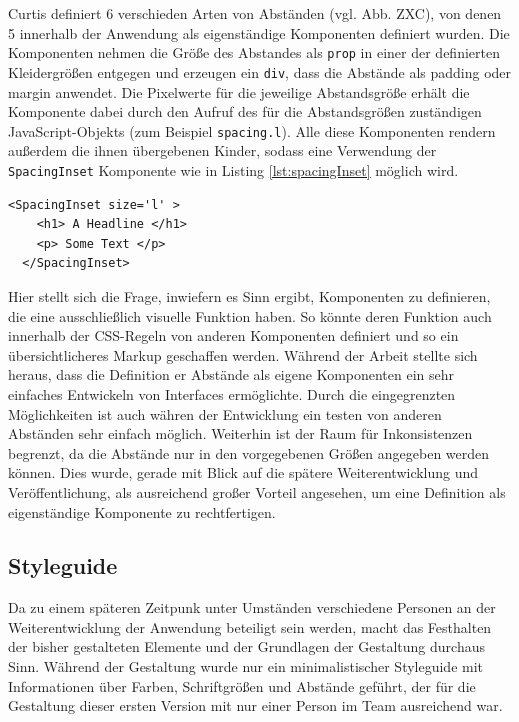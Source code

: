 Curtis definiert 6 verschieden Arten von Abständen (vgl. Abb. ZXC), von denen 5 innerhalb der Anwendung als eigenständige Komponenten definiert wurden.
Die Komponenten nehmen die Größe des Abstandes als \verb|prop| in einer der definierten Kleidergrößen entgegen und erzeugen ein \verb|div|, dass die Abstände als padding oder margin anwendet.
Die Pixelwerte für die jeweilige Abstandsgröße erhält die Komponente dabei durch den Aufruf des für die Abstandsgrößen zuständigen JavaScript-Objekts (zum Beispiel \verb|spacing.l|). Alle diese Komponenten rendern außerdem die ihnen übergebenen Kinder, sodass eine Verwendung der \verb|SpacingInset| Komponente wie in Listing \ref{lst:spacingInset} möglich wird.

\begin{lstlisting}[caption=Beispielhafte Verwendung einer Komponente für Abstände, label=lst:spacingInset]
  <SpacingInset size='l' >
    <h1> A Headline </h1>
    <p> Some Text </p>
  </SpacingInset>
\end{lstlisting}

Hier stellt sich die Frage, inwiefern es Sinn ergibt, Komponenten zu definieren, die eine ausschließlich visuelle Funktion haben.
So könnte deren Funktion auch innerhalb der CSS-Regeln von anderen Komponenten definiert und so ein übersichtlicheres Markup geschaffen werden.
Während der Arbeit stellte sich heraus, dass die Definition er Abstände als eigene Komponenten ein sehr einfaches Entwickeln von Interfaces ermöglichte.  Durch die eingegrenzten Möglichkeiten ist auch währen der Entwicklung ein testen von anderen Abständen sehr einfach möglich.
Weiterhin ist der Raum für Inkonsistenzen begrenzt, da die Abstände nur in den vorgegebenen Größen angegeben werden können. Dies wurde, gerade mit Blick auf die spätere Weiterentwicklung und Veröffentlichung, als ausreichend großer Vorteil angesehen, um eine Definition als eigenständige Komponente zu rechtfertigen.

\subsection{Styleguide}
\label{chap:styleguide}
Da zu einem späteren Zeitpunk unter Umständen verschiedene Personen an der Weiterentwicklung der Anwendung beteiligt sein werden, macht das Festhalten der bisher gestalteten Elemente und der Grundlagen der Gestaltung durchaus Sinn.
Während der Gestaltung wurde nur ein minimalistischer Styleguide mit Informationen über Farben, Schriftgrößen und Abstände geführt, der für die Gestaltung dieser ersten Version mit nur einer Person im Team ausreichend war.

